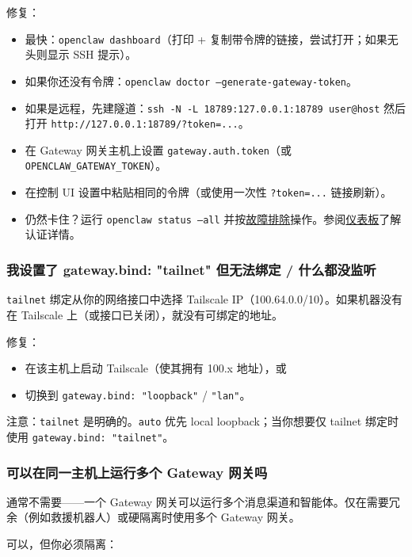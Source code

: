 修复：

\begin{itemize}
  \item 最快：\texttt{openclaw dashboard}（打印 + 复制带令牌的链接，尝试打开；如果无头则显示 SSH 提示）。
  \item 如果你还没有令牌：\texttt{openclaw doctor --generate-gateway-token}。
  \item 如果是远程，先建隧道：\texttt{ssh -N -L 18789:127.0.0.1:18789 user@host} 然后打开 \texttt{http://127.0.0.1:18789/?token=...}。
  \item 在 Gateway 网关主机上设置 \texttt{gateway.auth.token}（或 \texttt{OPENCLAW\_GATEWAY\_TOKEN}）。
  \item 在控制 UI 设置中粘贴相同的令牌（或使用一次性 \texttt{?token=...} 链接刷新）。
  \item 仍然卡住？运行 \texttt{openclaw status --all} 并按\href{/gateway/troubleshooting}{故障排除}操作。参阅\href{/web/dashboard}{仪表板}了解认证详情。
\end{itemize}


\subsubsection{我设置了 gateway.bind: "tailnet" 但无法绑定 / 什么都没监听}


\texttt{tailnet} 绑定从你的网络接口中选择 Tailscale IP（100.64.0.0/10）。如果机器没有在 Tailscale 上（或接口已关闭），就没有可绑定的地址。

修复：

\begin{itemize}
  \item 在该主机上启动 Tailscale（使其拥有 100.x 地址），或
  \item 切换到 \texttt{gateway.bind: "loopback"} / \texttt{"lan"}。
\end{itemize}


注意：\texttt{tailnet} 是明确的。\texttt{auto} 优先 local loopback；当你想要仅 tailnet 绑定时使用 \texttt{gateway.bind: "tailnet"}。

\subsubsection{可以在同一主机上运行多个 Gateway 网关吗}


通常不需要——一个 Gateway 网关可以运行多个消息渠道和智能体。仅在需要冗余（例如救援机器人）或硬隔离时使用多个 Gateway 网关。

可以，但你必须隔离：

